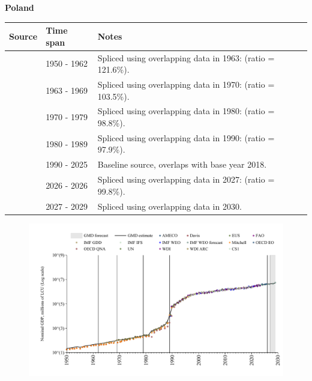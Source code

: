 \documentclass[12pt,a4paper,landscape]{article}
\begin{document}
\begin{adjustbox}{max totalsize={\paperwidth}{\paperheight},center}
\begin{minipage}[t][\textheight][t]{\textwidth}
\vspace*{0.5cm}
{}
\begin{center}
{\Large\bfseries Poland}
\end{center}
\vspace{0.5cm}
\begin{table}[H]
\centering
\small
\begin{tabular}{|l|l|l|}
\hline
\textbf{Source} & \textbf{Time span} & \textbf{Notes} \\
\hline
\rowcolor{white}\cite{Mitchell}& 1950 - 1962 &Spliced using overlapping data in 1963: (ratio = 121.6\%).\\
\rowcolor{lightgray}\cite{IMF_GDD}& 1963 - 1969 &Spliced using overlapping data in 1970: (ratio = 103.5\%).\\
\rowcolor{white}\cite{UN}& 1970 - 1979 &Spliced using overlapping data in 1980: (ratio = 98.8\%).\\
\rowcolor{lightgray}\cite{AMECO}& 1980 - 1989 &Spliced using overlapping data in 1990: (ratio = 97.9\%).\\
\rowcolor{white}\cite{OECD_EO}& 1990 - 2025 &Baseline source, overlaps with base year 2018.\\
\rowcolor{lightgray}\cite{AMECO}& 2026 - 2026 &Spliced using overlapping data in 2027: (ratio = 99.8\%).\\
\rowcolor{white}\cite{IMF_WEO_forecast}& 2027 - 2029 &Spliced using overlapping data in 2030.\\
\hline
\end{tabular}
\end{table}
\begin{figure}[H]
\centering
\includegraphics[width=\textwidth,height=0.6\textheight,keepaspectratio]{graphs/POL_nGDP.pdf}
\end{figure}
\end{minipage}
\end{adjustbox}
\end{document}
